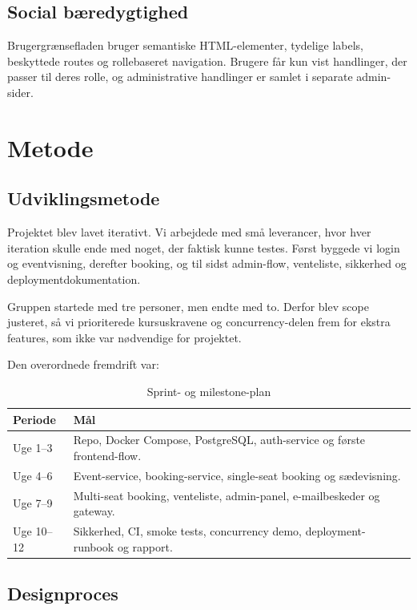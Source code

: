 \documentclass[11pt,a4paper]{article}
\begin{document}
\subsection{Social bæredygtighed}

Brugergrænsefladen bruger semantiske HTML-elementer, tydelige labels, beskyttede routes og rollebaseret navigation. Brugere får kun vist handlinger, der passer til deres rolle, og administrative handlinger er samlet i separate admin-sider.

\section{Metode}

\subsection{Udviklingsmetode}

Projektet blev lavet iterativt. Vi arbejdede med små leverancer, hvor hver iteration skulle ende med noget, der faktisk kunne testes. Først byggede vi login og eventvisning, derefter booking, og til sidst admin-flow, venteliste, sikkerhed og deploymentdokumentation.

Gruppen startede med tre personer, men endte med to. Derfor blev scope justeret, så vi prioriterede kursuskravene og concurrency-delen frem for ekstra features, som ikke var nødvendige for projektet.

Den overordnede fremdrift var:

\begin{table}[h]
\centering
\caption{Sprint- og milestone-plan}
\begin{tabularx}{\textwidth}{@{}L{3cm}Y@{}}
\toprule
Periode & Mål \\
\midrule
Uge 1--3 & Repo, Docker Compose, PostgreSQL, auth-service og første frontend-flow. \\
Uge 4--6 & Event-service, booking-service, single-seat booking og sædevisning. \\
Uge 7--9 & Multi-seat booking, venteliste, admin-panel, e-mailbeskeder og gateway. \\
Uge 10--12 & Sikkerhed, CI, smoke tests, concurrency demo, deployment-runbook og rapport. \\
\bottomrule
\end{tabularx}
\end{table}

\subsection{Designproces}
\end{document}

